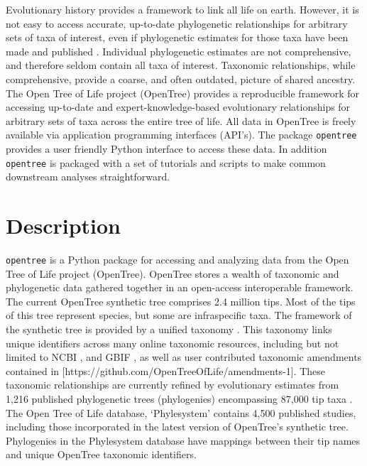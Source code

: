 \documentclass[oupdraft]{sysbio_sse}
\begin{document}
Evolutionary history provides a framework to link all life on earth. However, it is not easy to access accurate, up-to-date phylogenetic relationships for arbitrary sets of taxa of interest, even if phylogenetic estimates for those taxa have been made and published \citep{drew_lost_2013, mctavish_how_2017}. Individual phylogenetic estimates are not comprehensive, and therefore seldom contain all taxa of interest. Taxonomic relationships, while comprehensive, provide a coarse, and often outdated, picture of shared ancestry.
The Open Tree of Life project (OpenTree) provides a reproducible framework for accessing up-to-date and expert-knowledge-based evolutionary relationships for arbitrary sets of taxa across the entire tree of life.
All data in OpenTree is freely available via application programming interfaces (API's).
The package \texttt{opentree} provides a user friendly Python interface to access these data. In addition \texttt{opentree} is packaged with a set of tutorials and scripts to make common downstream analyses straightforward.

\bigskip
\section{Description}
\label{sec2}

\texttt{opentree} is a Python package for accessing and analyzing data from the Open Tree of Life project (OpenTree).
OpenTree stores a wealth of taxonomic and phylogenetic data gathered together in an open-access interoperable framework.
The current OpenTree synthetic tree \citep{opentreeoflife_open_2019} comprises 2.4 million tips.
Most of the tips of this tree represent species, but some are infraspecific taxa.
The framework of the synthetic tree is provided by a unified taxonomy \citep{opentreeoflife_open_2019-1, rees_automated_2017}.
This taxonomy links unique identifiers across many online taxonomic resources, including but not limited to NCBI \citep{federhen_ncbi_2012}, and GBIF \citep{gbif_secretariat_gbif_2019}, as well as user contributed taxonomic amendments contained in [https://github.com/OpenTreeOfLife/amendments-1].
These taxonomic relationships are currently refined by evolutionary estimates from 1,216 published phylogenetic trees (phylogenies) encompassing 87,000 tip taxa \citep{opentreeoflife_open_2019, redelings_supertree_2017}.
The Open Tree of Life database, `Phylesystem' \citep{mctavish_phylesystem_2015} contains 4,500 published studies, including those incorporated in the latest version of OpenTree's synthetic tree. Phylogenies in the Phylesystem database have mappings between their tip names and unique OpenTree taxonomic identifiers.
\end{document}
